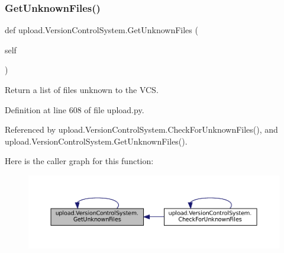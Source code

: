 \subsubsection{\texorpdfstring{Get\+Unknown\+Files()}{GetUnknownFiles()}\hspace{0.1cm}{\footnotesize\ttfamily [2/2]}}
{\footnotesize\ttfamily def upload.\+Version\+Control\+System.\+Get\+Unknown\+Files (\begin{DoxyParamCaption}\item[{}]{self }\end{DoxyParamCaption})}

\begin{DoxyVerb}Return a list of files unknown to the VCS.\end{DoxyVerb}
 

Definition at line 608 of file upload.\+py.



Referenced by upload.\+Version\+Control\+System.\+Check\+For\+Unknown\+Files(), and upload.\+Version\+Control\+System.\+Get\+Unknown\+Files().


Here is the caller graph for this function\+:
\nopagebreak
\begin{figure}[H]
\begin{center}
\leavevmode
\includegraphics[width=350pt]{classupload_1_1VersionControlSystem_a56a60e56aa9aff3df4001d2f84cab884_icgraph}
\end{center}
\end{figure}
\mbox{\label{classupload_1_1VersionControlSystem_a846889ecd2ef40870b456ddb5b349e02}} 
